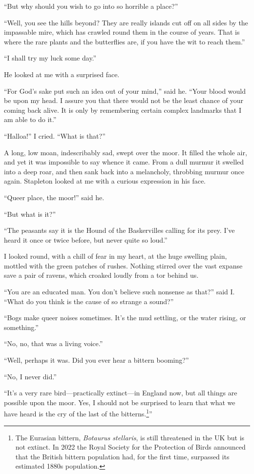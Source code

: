 \documentclass[paper=a5,BCOR=7mm,twoside,DIV=calc,12pt,usegeometry,openany,chapterprefix,endperiod,headings=big]{scrbook} %
\begin{document}
\afterpage{\clearpage}

\enquote{But why should you wish to go into so horrible a place?}

\enquote{Well, you see the hills beyond? They are really islands cut off on all sides by the impassable mire, which has crawled round them in the course of years. That is where the rare plants and the butterflies are, if you have the wit to reach them.}

\enquote{I shall try my luck some day.}

He looked at me with a surprised face.

\enquote{For God's sake put such an idea out of your mind,} said he. \enquote{Your blood would be upon my head. I assure you that there would not be the least chance of your coming back alive. It is only by remembering certain complex landmarks that I am able to do it.}

\enquote{Halloa!} I cried. \enquote{What is that?}

A long, low moan, indescribably sad, swept over the moor. It filled the whole air, and yet it was impossible to say whence it came. From a dull murmur it swelled into a deep roar, and then sank back into a melancholy, throbbing murmur once again. Stapleton looked at me with a curious expression in his face.

\enquote{Queer place, the moor!} said he.

\enquote{But what is it?}

\enquote{The peasants say it is the Hound of the Baskervilles calling for its prey. I've heard it once or twice before, but never quite so loud.}

I looked round, with a chill of fear in my heart, at the huge swelling plain, mottled with the green patches of rushes. Nothing stirred over the vast expanse save a pair of ravens, which croaked loudly from a tor behind us.

\enquote{You are an educated man. You don't believe such nonsense as that?} said I. \enquote{What do you think is the cause of so strange a sound?}

\enquote{Bogs make queer noises sometimes. It's the mud settling, or the water rising, or something.}

\enquote{No, no, that was a living voice.}

\enquote{Well, perhaps it was. Did you ever hear a bittern booming?}

\enquote{No, I never did.}

\enquote{It's a very rare bird---practically extinct---in England now, but all things are possible upon the moor. Yes, I should not be surprised to learn that what we have heard is the cry of the last of the bitterns.\footnote{The Eurasian bittern, \textit{Botaurus stellaris}, is still threatened in the UK but is not extinct. In 2022 the Royal Society for the Protection of Birds announced that the British bittern population had, for the first time, surpassed its estimated 1880s population.}}
\end{document}
